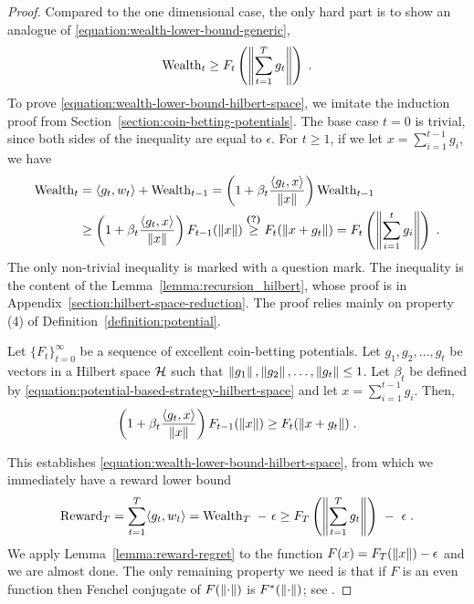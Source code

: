 \begin{proof}
Compared to the one dimensional case, the only hard part is to show an analogue of \eqref{equation:wealth-lower-bound-generic},
\begin{equation}
\label{equation:wealth-lower-bound-hilbert-space}
\operatorname{Wealth}_t \ge F_t\left(\left\|{\sum_{t=1}^T g_t}\right\| \right) \; .
\end{equation}
To prove \eqref{equation:wealth-lower-bound-hilbert-space}, we imitate the induction
proof from Section~\ref{section:coin-betting-potentials}. The base case
$t=0$ is trivial, since both sides of the inequality are equal to $\epsilon$.
For $t \ge 1$, if we let $x = \sum_{i=1}^{t-1} g_i$, we have
\begin{align*}
\operatorname{Wealth}_t
&= \langle g_t, w_t \rangle + \operatorname{Wealth}_{t-1}
= \left(1 + \beta_t \frac{\langle g_t, x \rangle}{\left\|{x}\right\|} \right) \operatorname{Wealth}_{t-1} \\
&\ge \left(1 + \beta_t \frac{\langle g_t, x \rangle}{\left\|{x}\right\|} \right) F_{t-1}(\left\|{x}\right\|)
\stackrel{\text{\textbf{(?)}}}{\ge} F_t(\left\|{x + g_t}\right\|)
= F_t\left(\left\|{\sum_{i=1}^t g_i}\right\| \right) \; .
\end{align*}
The only non-trivial inequality is marked with a question mark. The inequality
is the content of the Lemma~\ref{lemma:recursion_hilbert}, whose proof is in
Appendix~\ref{section:hilbert-space-reduction}. The proof relies mainly on
property (4) of Definition~\ref{definition:potential}.

\begin{lemma}
\label{lemma:recursion_hilbert}
Let $\{F_t\}_{t=0}^\infty$ be a sequence of excellent coin-betting potentials.
Let $g_1, g_2, \dots, g_t$ be vectors in a Hilbert space $\mathcal{H}$ such that
$\left\|{g_1}\right\|, \left\|{g_2}\right\|, \dots, \left\|{g_t}\right\| \le 1$. Let $\beta_t$
be defined by \eqref{equation:potential-based-strategy-hilbert-space}
and let $x = \sum_{i=1}^{t-1} g_i$. Then,
$$
\left(1 + \beta_t \frac{\langle g_t, x \rangle}{\left\|{x}\right\|} \right) F_{t-1}(\left\|{x}\right\|)
\ge F_t(\left\|{x + g_t}\right\|) \; .
$$
\end{lemma}

This establishes \eqref{equation:wealth-lower-bound-hilbert-space},
from which we immediately have a reward lower bound
\begin{equation}
\label{equation:hilbert-space-olo-reward-lower-bound}
\operatorname{Reward}_T
= \sum_{t=1}^T \langle g_t, w_t \rangle
= \operatorname{Wealth}_T \ - \ \epsilon
\ge F_T\left(\left\|{\sum_{t=1}^T g_t}\right\| \right) \ - \ \epsilon \; .
\end{equation}
We apply Lemma~\ref{lemma:reward-regret} to the function $F(x) = F_T(\left\|{x}\right\|) -
\epsilon$ and we are almost done. The only remaining property we need is that if
$F$ is an even function then Fenchel conjugate of $F(\left\|{\cdot}\right\|)$ is
$F^*(\left\|{\cdot}\right\|)$; see \citet[Example 13.7]{BauschkeC2011}.
\end{proof}
